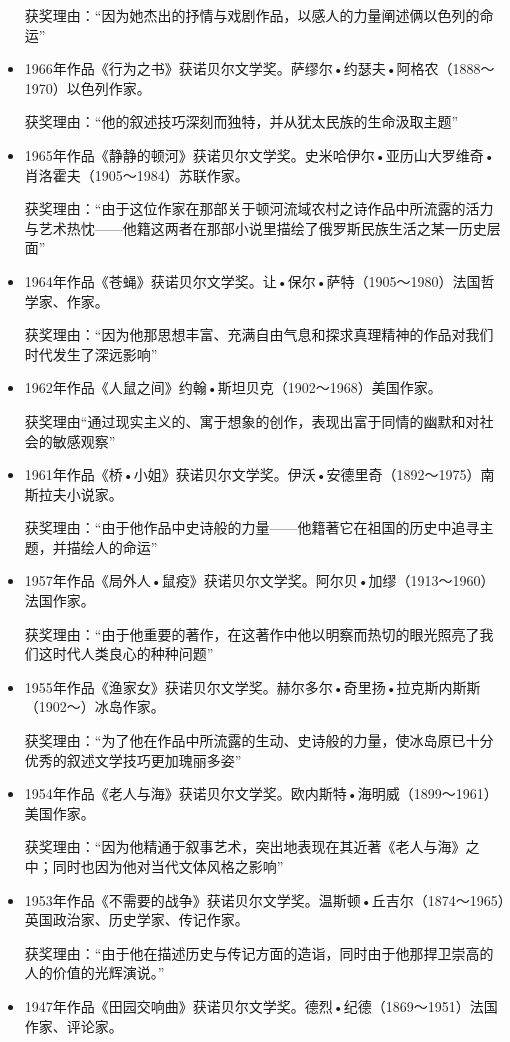 \documentclass[UTF8,a4paper,8pt]{ctexbook}
\begin{document}
\begin{itemize}
			获奖理由：“因为她杰出的抒情与戏剧作品，以感人的力量阐述俩以色列的命运”
			\item 1966年作品《行为之书》获诺贝尔文学奖。萨缪尔•约瑟夫•阿格农（1888～1970）以色列作家。
			
			获奖理由：“他的叙述技巧深刻而独特，并从犹太民族的生命汲取主题” 
			\item 1965年作品《静静的顿河》获诺贝尔文学奖。史米哈伊尔•亚历山大罗维奇•肖洛霍夫（1905～1984）苏联作家。
			
			获奖理由：“由于这位作家在那部关于顿河流域农村之诗作品中所流露的活力与艺术热忱——他籍这两者在那部小说里描绘了俄罗斯民族生活之某一历史层面”
			\item 1964年作品《苍蝇》获诺贝尔文学奖。让•保尔•萨特（1905～1980）法国哲学家、作家。
			
			获奖理由：“因为他那思想丰富、充满自由气息和探求真理精神的作品对我们时代发生了深远影响”
			\item 1962年作品《人鼠之间》约翰•斯坦贝克（1902～1968）美国作家。
			
			获奖理由“通过现实主义的、寓于想象的创作，表现出富于同情的幽默和对社会的敏感观察”
			\item 1961年作品《桥•小姐》获诺贝尔文学奖。伊沃•安德里奇（1892～1975）南斯拉夫小说家。
			
			获奖理由：“由于他作品中史诗般的力量——他籍著它在祖国的历史中追寻主题，并描绘人的命运”
			\item 1957年作品《局外人•鼠疫》获诺贝尔文学奖。阿尔贝•加缪（1913～1960）法国作家。
			
			获奖理由：“由于他重要的著作，在这著作中他以明察而热切的眼光照亮了我们这时代人类良心的种种问题”
			\item 1955年作品《渔家女》获诺贝尔文学奖。赫尔多尔•奇里扬•拉克斯内斯斯（1902～）冰岛作家。
			
			获奖理由：“为了他在作品中所流露的生动、史诗般的力量，使冰岛原已十分优秀的叙述文学技巧更加瑰丽多姿”
			\item 1954年作品《老人与海》获诺贝尔文学奖。欧内斯特•海明威（1899～1961）美国作家。
			
			获奖理由：“因为他精通于叙事艺术，突出地表现在其近著《老人与海》之中；同时也因为他对当代文体风格之影响”
			\item 1953年作品《不需要的战争》获诺贝尔文学奖。温斯顿•丘吉尔（1874～1965）英国政治家、历史学家、传记作家。
			
			获奖理由：“由于他在描述历史与传记方面的造诣，同时由于他那捍卫崇高的人的价值的光辉演说。”
			\item 1947年作品《田园交响曲》获诺贝尔文学奖。德烈•纪德（1869～1951）法国作家、评论家。
			

\end{itemize}
\end{document}
